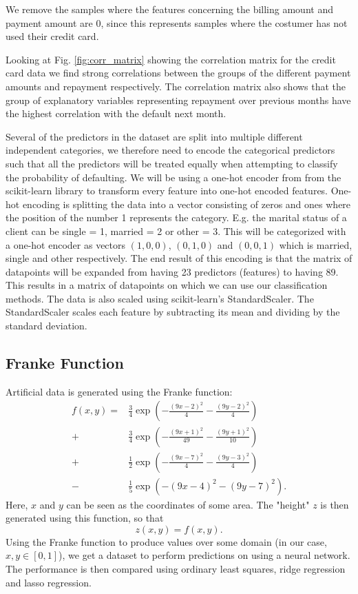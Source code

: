 \documentclass[%
 reprint,
nofootinbib,
 amsmath,amssymb,
 aps,
]{revtex4-2}
\begin{document}
We remove the samples where the features concerning the billing amount and payment amount are 0, since this represents samples where the costumer has not used their credit card.

Looking at Fig. \ref{fig:corr_matrix} showing the correlation matrix for the credit card data we find strong correlations between the groups of the different payment amounts and repayment respectively. The correlation matrix also shows that the group of explanatory variables representing repayment over previous months have the highest correlation with the default next month.

Several of the predictors in the dataset are split into multiple different independent categories, we therefore need to encode the categorical predictors such that all the predictors will be treated equally when attempting to classify the probability of defaulting. We will be using a one-hot encoder from from the scikit-learn library to transform every feature into one-hot encoded features. One-hot encoding is splitting the data into a vector consisting of zeros and ones where the position of the number 1 represents the category. E.g. the marital status of a client can be single = 1, married = 2 or other = 3. This will be categorized with a one-hot encoder as vectors $(1,0,0)$, $(0,1,0)$ and $(0,0,1)$ which is married, single and other respectively. The end result of this encoding is that the matrix of datapoints will be expanded from having 23 predictors (features) to having 89. This results in a matrix of datapoints on which we can use our classification methods. The data is also scaled using scikit-learn's StandardScaler. The StandardScaler scales each feature by subtracting its mean and dividing by the standard deviation.

\subsection{Franke Function}\label{sec:franke_data}
Artificial data is generated using the Franke function:
%
\begin{align*}
f(x,y) = &\frac{3}{4} \exp\left( -\frac{(9x-2)^2}{4} -\frac{(9y - 2)^2}{4} \right) \\+&\frac{3}{4} \exp\left( -\frac{(9x+1)^2}{49} - \frac{(9y + 1)^2}{10} \right) \\+&\frac{1}{2} \exp\left( -\frac{(9x-7)^2}{4} - \frac{(9y - 3)^2}{4} \right)\\-&\frac{1}{5} \exp\left( -(9x-4)^2 - (9y - 7)^2 \right) .
\end{align*}
%
Here, $x$ and $y$ can be seen as the coordinates of some area. The "height" $z$ is then generated using this function, so that
%
\begin{equation}
z(x, y) = f(x, y) .
\end{equation}
%
Using the Franke function to produce values over some domain (in our case, $x, y \in [0,1]$), we get a dataset to perform predictions on using a neural network. The performance is then compared using ordinary least squares, ridge regression and lasso regression.
\end{document}
